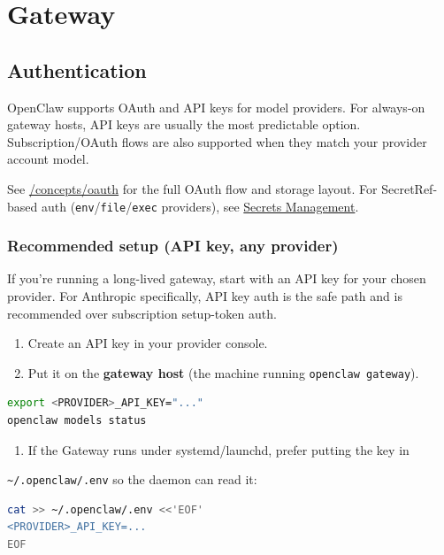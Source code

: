 \chapter{Gateway}

\section{Authentication}


OpenClaw supports OAuth and API keys for model providers. For always-on gateway
hosts, API keys are usually the most predictable option. Subscription/OAuth
flows are also supported when they match your provider account model.

See \href{/concepts/oauth}{/concepts/oauth} for the full OAuth flow and storage
layout.
For SecretRef-based auth (\texttt{env}/\texttt{file}/\texttt{exec} providers), see \href{/gateway/secrets}{Secrets Management}.

\subsection{Recommended setup (API key, any provider)}


If you’re running a long-lived gateway, start with an API key for your chosen
provider.
For Anthropic specifically, API key auth is the safe path and is recommended
over subscription setup-token auth.

\begin{enumerate}
  \item Create an API key in your provider console.
  \item Put it on the \textbf{gateway host} (the machine running \texttt{openclaw gateway}).
\end{enumerate}


\begin{lstlisting}[language=bash]
export <PROVIDER>_API_KEY="..."
openclaw models status
\end{lstlisting}


\begin{enumerate}
  \item If the Gateway runs under systemd/launchd, prefer putting the key in
\end{enumerate}

\texttt{\textasciitilde{}/.openclaw/.env} so the daemon can read it:

\begin{lstlisting}[language=bash]
cat >> ~/.openclaw/.env <<'EOF'
<PROVIDER>_API_KEY=...
EOF
\end{lstlisting}


